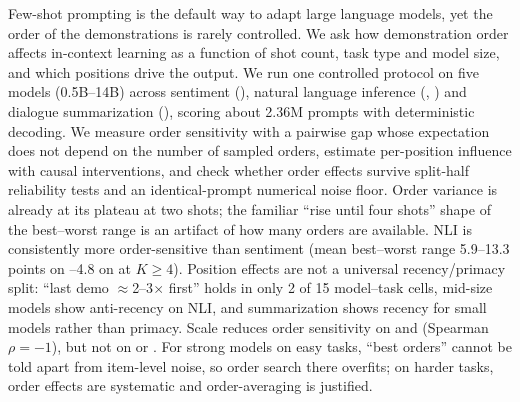 Few-shot prompting is the default way to adapt large language models, yet the order of the demonstrations is rarely controlled.
We ask how demonstration order affects in-context learning as a function of shot count, task type and model size, and which positions drive the output.
We run one controlled protocol on five \qwen models (0.5B--14B) across sentiment (\sst), natural language inference (\rte, \mnli) and dialogue summarization (\samsum), scoring about 2.36M prompts with deterministic decoding.
We measure order sensitivity with a pairwise gap whose expectation does not depend on the number of sampled orders, estimate per-position influence with causal interventions, and check whether order effects survive split-half reliability tests and an identical-prompt numerical noise floor.
Order variance is already at its plateau at two shots; the familiar ``rise until four shots'' shape of the best--worst range is an artifact of how many orders are available.
NLI is consistently more order-sensitive than sentiment (mean best--worst range 5.9--13.3 points on \mnli {}--4.8 on \sst at $K\geq4$).
Position effects are not a universal recency/primacy split: ``last demo $\approx$2--3$\times$ first'' holds in only 2 of 15 model--task cells, mid-size models show anti-recency on NLI, and summarization shows recency for small models rather than primacy.
Scale reduces order sensitivity on \sst and \rte (Spearman $\rho=-1$), but not on \mnli or \samsum.
For strong models on easy tasks, ``best orders'' cannot be told apart from item-level noise, so order search there overfits; on harder tasks, order effects are systematic and order-averaging is justified.
